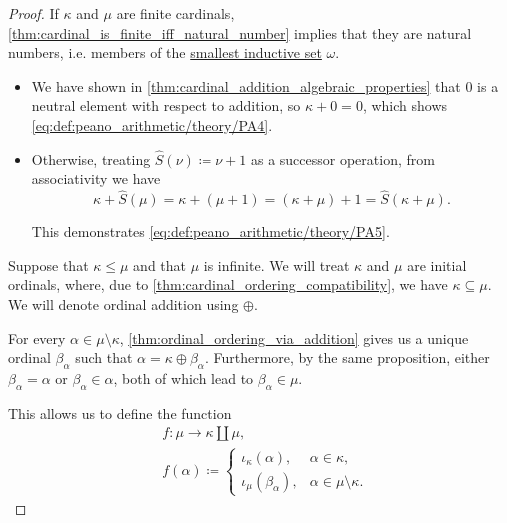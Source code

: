 \begin{proof}
   If \( \kappa \) and \( \mu \) are finite cardinals, \cref{thm:cardinal_is_finite_iff_natural_number} implies that they are natural numbers, i.e. members of the \hyperref[def:smallest_inductive_set]{smallest inductive set} \( \omega \).

  \begin{itemize}
    \item We have shown in \cref{thm:cardinal_addition_algebraic_properties} that \( 0 \) is a neutral element with respect to addition, so \( \kappa + 0 = 0 \), which shows \eqref{eq:def:peano_arithmetic/theory/PA4}.

    \item Otherwise, treating \( \widehat{S}(\nu) \coloneqq \nu + 1 \) as a successor operation, from associativity we have
    \begin{equation*}
      \kappa + \widehat{S}(\mu)
      =
      \kappa + (\mu + 1)
      =
      (\kappa + \mu) + 1
      =
      \widehat{S}(\kappa + \mu).
    \end{equation*}

    This demonstrates \eqref{eq:def:peano_arithmetic/theory/PA5}.
  \end{itemize}

   Suppose that \( \kappa \leq \mu \) and that \( \mu \) is infinite. We will treat \( \kappa \) and \( \mu \) are initial ordinals, where, due to \cref{thm:cardinal_ordering_compatibility}, we have \( \kappa \subseteq \mu \). We will denote ordinal addition using \( {\oplus} \).

  For every \( \alpha \in \mu \setminus \kappa \), \cref{thm:ordinal_ordering_via_addition} gives us a unique ordinal \( \beta_\alpha \) such that \( \alpha = \kappa \oplus \beta_\alpha \). Furthermore, by the same proposition, either \( \beta_\alpha = \alpha \) or \( \beta_\alpha \in \alpha \), both of which lead to \( \beta_\alpha \in \mu \).

  This allows us to define the function
  \begin{equation*}
    \begin{aligned}
      &f: \mu \to \kappa \amalg \mu, \\
      &f(\alpha) \coloneqq \begin{cases}
        \iota_\kappa(\alpha),    &\alpha \in \kappa, \\
        \iota_\mu(\beta_\alpha), &\alpha \in \mu \setminus \kappa.
      \end{cases}
    \end{aligned}
  \end{equation*}


\end{proof}
